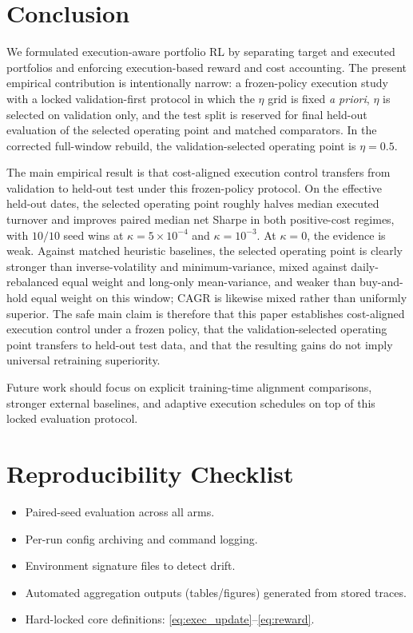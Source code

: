 \documentclass[10pt,twocolumn]{article}
\begin{document}
\section{Conclusion}
We formulated execution-aware portfolio RL by separating target and executed portfolios and enforcing execution-based reward and cost accounting. The present empirical contribution is intentionally narrow: a frozen-policy execution study with a locked validation-first protocol in which the $\eta$ grid is fixed \emph{a priori}, $\eta$ is selected on validation only, and the test split is reserved for final held-out evaluation of the selected operating point and matched comparators. In the corrected full-window rebuild, the validation-selected operating point is $\eta=0.5$.

The main empirical result is that cost-aligned execution control transfers from validation to held-out test under this frozen-policy protocol. On the effective held-out dates, the selected operating point roughly halves median executed turnover and improves paired median net Sharpe in both positive-cost regimes, with $10/10$ seed wins at $\kappa=5\times10^{-4}$ and $\kappa=10^{-3}$. At $\kappa=0$, the evidence is weak. Against matched heuristic baselines, the selected operating point is clearly stronger than inverse-volatility and minimum-variance, mixed against daily-rebalanced equal weight and long-only mean-variance, and weaker than buy-and-hold equal weight on this window; CAGR is likewise mixed rather than uniformly superior. The safe main claim is therefore that this paper establishes cost-aligned execution control under a frozen policy, that the validation-selected operating point transfers to held-out test data, and that the resulting gains do not imply universal retraining superiority.

Future work should focus on explicit training-time alignment comparisons, stronger external baselines, and adaptive execution schedules on top of this locked evaluation protocol.

\appendix
\section{Reproducibility Checklist}
\label{app:repro}
\begin{itemize}[leftmargin=*,itemsep=1pt]
\item Paired-seed evaluation across all arms.
\item Per-run config archiving and command logging.
\item Environment signature files to detect drift.
\item Automated aggregation outputs (tables/figures) generated from stored traces.
\item Hard-locked core definitions: \eqref{eq:exec_update}--\eqref{eq:reward}.
\end{itemize}
\end{document}
